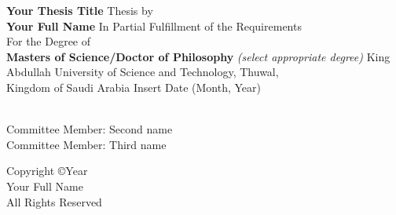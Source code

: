 \documentclass[onecolumn, 12 pt, doublespace, fullpage, letterpaper]{report}
\begin{document}

\vspace{2pt}
\thispagestyle{empty}
\addvspace{10mm}

\begin{center}
{\bf\Large Your Thesis Title}\vfill
{\Large Thesis by}\\
{\bf\Large Your Full Name}\vfill
{\Large In Partial Fulfillment of the Requirements}\\[12pt]
{\Large For the Degree of}\\[12pt]
{\bf\Large Masters of Science/Doctor of Philosophy} \textit{(select appropriate degree)}\vfill
{King Abdullah University of Science and Technology, Thuwal,}\\
{Kingdom of Saudi Arabia}
\vfill
{Insert Date (Month, Year)}\vfill

\end{center}

\newpage
{}

\vspace{6\baselineskip}

\\
Committee Member: Second name\\
Committee Member: Third name\vfill


\newpage
{}
\vspace*{\fill}
\begin{center}
{Copyright \copyright Year}\\
{Your Full Name}\\
{All Rights Reserved}
\end{center}


\end{document}
